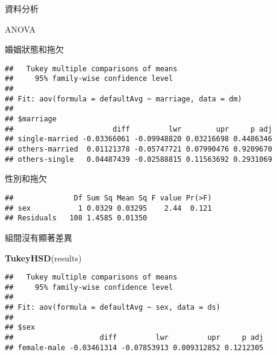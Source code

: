 \documentclass[ignorenonframetext,]{beamer}
\newenvironment{Shaded}{\begin{snugshade}}{\end{snugshade}}
\newcommand{\KeywordTok}[1]{\textcolor[rgb]{0.13,0.29,0.53}{\textbf{#1}}}
\newcommand{\DataTypeTok}[1]{\textcolor[rgb]{0.13,0.29,0.53}{#1}}
\newcommand{\StringTok}[1]{\textcolor[rgb]{0.31,0.60,0.02}{#1}}
\newcommand{\OperatorTok}[1]{\textcolor[rgb]{0.81,0.36,0.00}{\textbf{#1}}}
\newcommand{\NormalTok}[1]{#1}
\begin{document}
\begin{frame}[fragile]{資料分析}
\begin{block}{ANOVA}
\begin{block}{婚姻狀態和拖欠}
\begin{verbatim}
##   Tukey multiple comparisons of means
##     95% family-wise confidence level
## 
## Fit: aov(formula = defaultAvg ~ marriage, data = dm)
## 
## $marriage
##                       diff         lwr        upr     p adj
## single-married -0.03366061 -0.09948820 0.03216698 0.4486346
## others-married  0.01121378 -0.05747721 0.07990476 0.9209670
## others-single   0.04487439 -0.02588815 0.11563692 0.2931069
\end{verbatim}

\end{block}

\begin{block}{性別和拖欠}

\begin{Shaded}
\end{Shaded}

\begin{verbatim}
##              Df Sum Sq Mean Sq F value Pr(>F)
## sex           1 0.0329 0.03295    2.44  0.121
## Residuals   108 1.4585 0.01350
\end{verbatim}

組間沒有顯著差異

\begin{Shaded}
\begin{Highlighting}[]
\KeywordTok{TukeyHSD}\NormalTok{(results)}
\end{Highlighting}
\end{Shaded}

\begin{verbatim}
##   Tukey multiple comparisons of means
##     95% family-wise confidence level
## 
## Fit: aov(formula = defaultAvg ~ sex, data = ds)
## 
## $sex
##                    diff         lwr         upr     p adj
## female-male -0.03461314 -0.07853913 0.009312852 0.1212305
\end{verbatim}

\end{block}

\end{block}

\end{frame}
\end{document}
